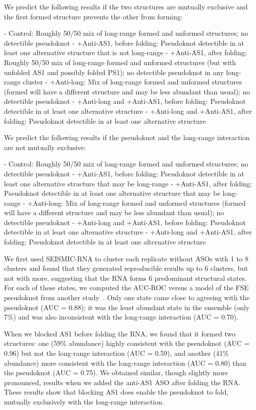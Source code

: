 \documentclass[main.tex]{subfiles}
\begin{document}
We predict the following results if the two structures are mutually exclusive and the first formed structure prevents the other from forming:

- Control: Roughly 50/50 mix of long-range formed and unformed structures; no detectible pseudoknot
- +Anti-AS1, before folding: Pseudoknot detectible in at least one alternative structure that is not long-range
- +Anti-AS1, after folding: Roughly 50/50 mix of long-range formed and unformed structures (but with unfolded AS1 and possibly folded PS1); no detectible pseudoknot in any long-range cluster
- +Anti-long: Mix of long-range formed and unformed structures (formed will have a different structure and may be less abundant than usual); no detectible pseudoknot
- +Anti-long and +Anti-AS1, before folding: Pseudoknot detectible in at least one alternative structure
- +Anti-long and +Anti-AS1, after folding: Pseudoknot detectible in at least one alternative structure

We predict the following results if the pseudoknot and the long-range interaction are not mutually exclusive:

- Control: Roughly 50/50 mix of long-range formed and unformed structures; no detectible pseudoknot
- +Anti-AS1, before folding: Pseudoknot detectible in at least one alternative structure that may be long-range
- +Anti-AS1, after folding: Pseudoknot detectible in at least one alternative structure that may be long-range
- +Anti-long: Mix of long-range formed and unformed structures (formed will have a different structure and may be less abundant than usual); no detectible pseudoknot
- +Anti-long and +Anti-AS1, before folding: Pseudoknot detectible in at least one alternative structure
- +Anti-long and +Anti-AS1, after folding: Pseudoknot detectible in at least one alternative structure

We first used SEISMIC-RNA to cluster each replicate without ASOs with 1 to 8 clusters and found that they generated reproducible results up to 6 clusters, but not with more, suggesting that the RNA forms 6 predominant structural states.
For each of these states, we computed the AUC-ROC versus a model of the FSE pseudoknot from another study~\cite{KZhang2021}.
Only one state came close to agreeing with the pseudoknot (AUC = 0.88); it was the least abundant state in the ensemble (only 7\%) and was also inconsistent with the long-range interaction (AUC = 0.70).

When we blocked AS1 before folding the RNA, we found that it formed two structures: one (59\% abundance) highly consistent with the pseudoknot (AUC = 0.96) but not the long-range interaction (AUC = 0.59), and another (41\% abundance) more consistent with the long-range interaction (AUC = 0.80) than the pseudoknot (AUC = 0.75).
We obtained similar, though slightly more pronounced, results when we added the anti-AS1 ASO after folding the RNA.
These results show that blocking AS1 does enable the pseudoknot to fold, mutually exclusively with the long-range interaction.
\end{document}
